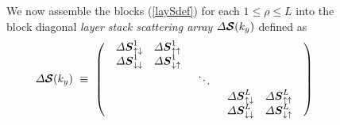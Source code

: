 \begin{figure}
{\begin{minipage} {140.0mm}
We now assemble the blocks (\ref{laySdef}) for each $1 \le \rho \le L$ 
into the block diagonal {\em layer stack scattering array\/}
 ${\mit \Delta}{\mbox{\boldmath$\cal S$\unboldmath}}(k_y)$ defined as
\begin{equation} \label{GSdef}
{\mit \Delta}{\mbox{\boldmath$\cal S$\unboldmath}}(k_y) \ \equiv\ \left({\begin{array}{ccc}
\begin{array}{cc}{\mit \Delta}{\mbox{\boldmath$\mit S$\unboldmath}}_{\uparrow
\downarrow }^{1}&{\mit \Delta}{\mbox{\boldmath$\mit S$\unboldmath}}_{\uparrow \uparrow }^{1}\\ 
{\mit \Delta}{\mbox{\boldmath$\mit S$\unboldmath}}_{\downarrow\downarrow }^{1}&{\mit \Delta}{\mbox{\boldmath$\mit S$\unboldmath}}_{\downarrow \uparrow }^{1}
\end{array}&&\\ 
& \ddots &\\  
&&\begin{array}{cc}{\mit \Delta}{\mbox{\boldmath$\mit S$\unboldmath}}_{\uparrow \downarrow}^{L}&
{\mit \Delta}{\mbox{\boldmath$\mit S$\unboldmath}}_{\uparrow \uparrow }^{L}\\ 
{\mit \Delta}{\mbox{\boldmath$\mit S$\unboldmath}}_{\downarrow \downarrow }^{L}
&{\mit \Delta}{\mbox{\boldmath$\mit S$\unboldmath}}_{\downarrow \uparrow }^{L}\end{array}
\end{array}}\right)
\end{equation}


 




\vspace{6mm}
\end{minipage}
}
\end{figure}

